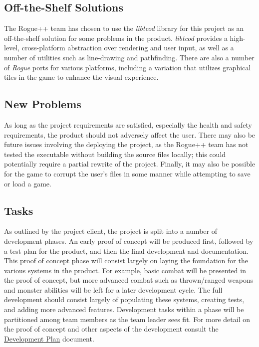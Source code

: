 \documentclass[12pt, titlepage]{article}
\begin{document}
	\subsection{Off-the-Shelf Solutions}

	The Rogue++ team has chosen to use the \textit{libtcod} library for this project as an off-the-shelf solution for some problems in the product.  \textit{libtcod} provides a high-level, cross-platform abstraction over rendering and user input, as well as a number of utilities such as line-drawing and pathfinding.  There are also a number of \textit{Rogue} ports for various platforms, including a variation that utilizes graphical tiles in the game to enhance the visual experience.

	\subsection{New Problems}

	As long as the project requirements are satisfied, especially the health and safety requirements, the product should not adversely affect the user.  There may also be future issues involving the deploying the project, as the Rogue++ team has not tested the executable without building the source files locally; this could potentially require a partial rewrite of the project.  Finally, it may also be possible for the game to corrupt the user's files in some manner while attempting to save or load a game.

	\subsection{Tasks}

	As outlined by the project client, the project is split into a number of development phases.  An early proof of concept will be produced first, followed by a test plan for the product, and then the final development and documentation.  This proof of concept phase will consist largely on laying the foundation for the various systems in the product.  For example, basic combat will be presented in the proof of concept, but more advanced combat such as thrown/ranged weapons and monster abilities will be left for a later development cycle.  The full development should consist largely of populating these systems, creating tests, and adding more advanced features.  Development tasks within a phase will be partitioned among team members as the team leader sees fit.  For more detail on the proof of concept and other aspects of the development consult the \href{../DevelopmentPlan/DevelopmentPlan.pdf}{Development Plan} document.
\end{document}
